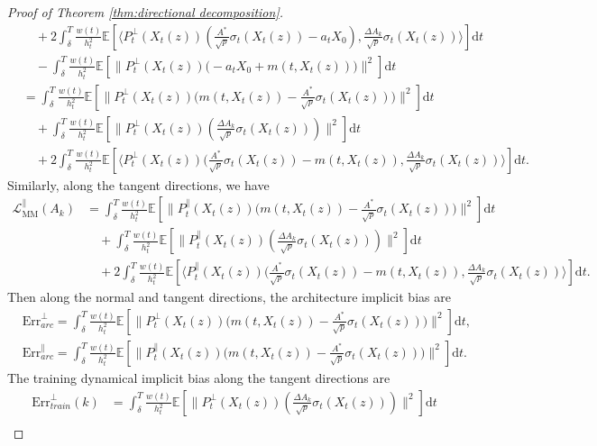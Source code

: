 \documentclass[11pt]{article}
\newcommand{\mb}{\mathbb}
\newcommand{\dee}{\mathrm{d}}
\newcommand{\mc}{\mathcal}
\newcommand{\Err}{\mathrm{Err}}
\begin{document}
\begin{proof}[Proof of Theorem \ref{thm:directional decomposition}]
\begin{align*}
    &\quad + 2\int_\delta^T \frac{w(t)}{h_t^2}\mb{E}[  \langle P_t^\perp(X_t(z))(\frac{A^*}{\sqrt{p}}\sigma_t(X_t(z)) -a_tX_0 ) , \frac{\Delta A_k}{\sqrt{p}}\sigma_t(X_t(z)) \rangle ] \dee t \\
    &\quad - \int_\delta^T \frac{w(t)}{h_t^2}\mb{E}[  \| P_t^\perp(X_t(z)) \big(-a_t X_0 + m(t,X_t(z)) \big) \|^2 ] \dee t \\
    & = \int_\delta^T \frac{w(t)}{h_t^2}\mb{E}[  \| P_t^\perp(X_t(z)) \big(m(t,X_t(z))-\frac{A^*}{\sqrt{p}}\sigma_t(X_t(z)) \big) \|^2 ] \dee t \\
    &\quad + \int_\delta^T \frac{w(t)}{h_t^2}\mb{E}[  \| P_t^\perp(X_t(z)) (\frac{\Delta A_k }{\sqrt{p}}\sigma_t(X_t(z))) \|^2 ] \dee t \\
    &\quad + 2\int_\delta^T \frac{w(t)}{h_t^2}\mb{E}[  \langle P_t^\perp(X_t(z))(\frac{A^*}{\sqrt{p}}\sigma_t(X_t(z)) -m(t,X_t(z) ) , \frac{\Delta A_k}{\sqrt{p}}\sigma_t(X_t(z)) \rangle ] \dee t.
\end{align*}
Similarly, along the tangent directions, we have
\begin{align*}
    \mc{L}_{\mathrm{MM}}^\parallel(A_k) & = \int_\delta^T \frac{w(t)}{h_t^2}\mb{E}[  \| P_t^\parallel(X_t(z)) \big(m(t,X_t(z))-\frac{A^*}{\sqrt{p}}\sigma_t(X_t(z)) \big) \|^2 ] \dee t \\
    &\quad + \int_\delta^T \frac{w(t)}{h_t^2}\mb{E}[  \| P_t^\parallel(X_t(z)) (\frac{\Delta A_k }{\sqrt{p}}\sigma_t(X_t(z))) \|^2 ] \dee t \\
    &\quad + 2\int_\delta^T \frac{w(t)}{h_t^2}\mb{E}[  \langle P_t^\parallel(X_t(z))(\frac{A^*}{\sqrt{p}}\sigma_t(X_t(z)) -m(t,X_t(z) ) , \frac{\Delta A_k}{\sqrt{p}}\sigma_t(X_t(z)) \rangle ] \dee t.
\end{align*}
Then along the normal and tangent directions, the architecture implicit bias are 
\begin{align*}
    &\Err_{arc}^\perp  = \int_\delta^T \frac{w(t)}{h_t^2}\mb{E}[  \| P_t^\perp(X_t(z))\big(  m(t,X_t(z))-\frac{A^*}{\sqrt{p}}\sigma_t(X_t(z))\big)  \|^2 ] \dee t,\\
    &\Err_{arc}^\parallel  = \int_\delta^T \frac{w(t)}{h_t^2}\mb{E}[  \| P_t^\parallel(X_t(z))\big(  m(t,X_t(z))-\frac{A^*}{\sqrt{p}}\sigma_t(X_t(z))\big)  \|^2 ] \dee t.
\end{align*}
The training dynamical implicit bias along the tangent directions are
\begin{align*}
    \Err_{train}^\perp(k) & = \int_\delta^T \frac{w(t)}{h_t^2}\mb{E}[  \| P_t^\perp(X_t(z)) (\frac{\Delta A_k }{\sqrt{p}}\sigma_t(X_t(z))) \|^2 ] \dee t \\

\end{align*}
\end{proof}
\end{document}
